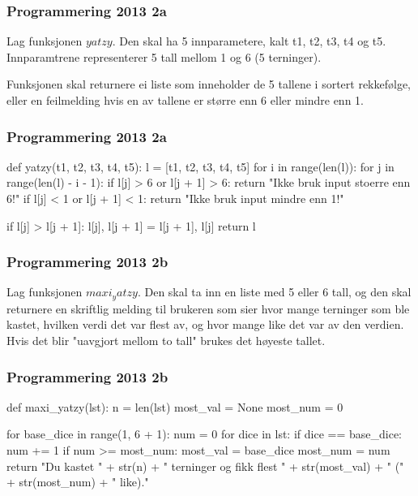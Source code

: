 \begin{frame}
    \frametitle{Programmering 2013 2a}

    Lag funksjonen $yatzy$. Den skal ha 5 innparametere, kalt t1, t2, t3, t4 og t5. Innparamtrene representerer 5 tall mellom 1 og 6 (5 terninger). 

    Funksjonen skal returnere ei liste som inneholder de 5 tallene i sortert rekkefølge, eller en feilmelding hvis en av tallene er større enn 6 eller mindre enn 1. 

\end{frame}

\begin{frame}[fragile]
    \frametitle{Programmering 2013 2a}

\begin{python}
def yatzy(t1, t2, t3, t4, t5):
    l = [t1, t2, t3, t4, t5]
    for i in range(len(l)): 
        for j in range(len(l) - i - 1):
            if l[j] > 6 or l[j + 1] > 6: 
                return "Ikke bruk input stoerre enn 6!"
            if l[j] < 1 or l[j + 1] < 1: 
                return "Ikke bruk input mindre enn 1!"

            if l[j] > l[j + 1]: 
                l[j], l[j + 1] = l[j + 1], l[j]
    return l 
\end{python}

\end{frame}

\begin{frame}
    \frametitle{Programmering 2013 2b}

    Lag funksjonen $maxi_yatzy$. Den skal ta inn en liste med 5 eller 6 tall, og den skal returnere en skriftlig melding til brukeren som sier hvor mange terninger som ble kastet, hvilken verdi det var flest av, og hvor mange like det var av den verdien. Hvis det blir "uavgjort mellom to tall" brukes det høyeste tallet. 

\end{frame}

\begin{frame}[fragile]
    \frametitle{Programmering 2013 2b}

\begin{python}
    def maxi_yatzy(lst):
    n = len(lst)
    most_val = None
    most_num = 0

    for base_dice in range(1, 6 + 1):
        num = 0
        for dice in lst: 
            if dice == base_dice: 
                num += 1 
        if num >= most_num: 
            most_val = base_dice 
            most_num = num 
    return "Du kastet " + str(n) + " terninger og fikk flest " + str(most_val)  + " (" + str(most_num) + " like)."
\end{python}

\end{frame}
